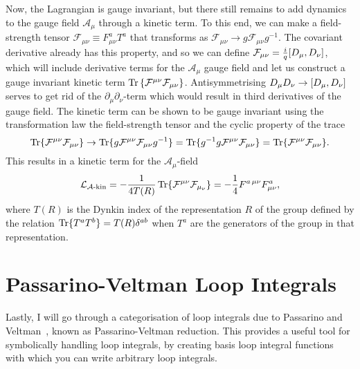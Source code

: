 \documentclass[../main.tex]{subfiles}
\begin{document}
Now, the Lagrangian is gauge invariant, but there still remains to add dynamics
to the gauge field \(\mathcal{A}_\mu\) through a kinetic term.
To this end, we can make a field-strength tensor \(\mathcal{F}_{\mu\nu} \equiv
F_{\mu\nu}^a T^a\) that transforms as \(\mathcal{F}_{\mu\nu} \to g
\mathcal{F}_{\mu\nu} g^{-1}\).
The covariant derivative already has this property, and so we can define
\(\mathcal{F}_{\mu\nu} = \frac{i}{q} [D_\mu,D_\nu]\), which will include
derivative terms for the \(\mathcal{A}_\mu\) gauge field and let us construct a
gauge invariant kinetic term \(\operatorname{Tr}\left\{\mathcal{F}^{\mu\nu} \mathcal{F}_{\mu\nu}\right\}\).
Antisymmetrising \(D_\mu D_\nu \to [D_\mu,D_\nu]\) serves to get rid of the \(\partial_\mu \partial_\nu\)-term which would result in third derivatives of the gauge field.
The kinetic term can be shown to be gauge invariant using the transformation law the field-strength tensor and the cyclic property of the trace
\begin{equation}
  \operatorname{Tr}\{\mathcal{F}^{\mu\nu} \mathcal{F}_{\mu\nu}\} \to
  \operatorname{Tr}\{g \mathcal{F}^{\mu\nu} \mathcal{F}_{\mu\nu} g^{-1}\} =
  \operatorname{Tr}\{g^{-1} g \mathcal{F}^{\mu\nu} \mathcal{F}_{\mu\nu}\} =
  \operatorname{Tr}\{\mathcal{F}^{\mu\nu} \mathcal{F}_{\mu\nu}\}.
\end{equation}
This results in a kinetic term for the \(\mathcal{A}_\mu\)-field
\begin{equation}
  \label{qft:eq:Akin}
  \mathcal{L}_{\mathcal{A}\text{-kin}} = -\frac{1}{4T(R)} \operatorname{Tr}\{\mathcal{F}^{\mu\nu} \mathcal{F}_{\mu_\nu}\} = -\frac{1}{4} F^{a\,\mu\nu} F^a_{\mu\nu},
\end{equation}
where \(T(R)\) is the Dynkin index of the representation \(R\) of the group defined by the relation \(\operatorname{Tr}\{T^a T^b\} = T(R) \delta^{ab}\) when \(T^a\) are the generators of the group in that representation.




\section{Passarino-Veltman Loop Integrals}
\label{qft:sec:pave}
Lastly, I will go through a categorisation of loop integrals due to Passarino and Veltman~\cite{PaVe}, known as Passarino-Veltman reduction.
This provides a useful tool for symbolically handling loop integrals, by creating basis loop integral functions with which you can write arbitrary loop integrals.
\medskip
\end{document}
